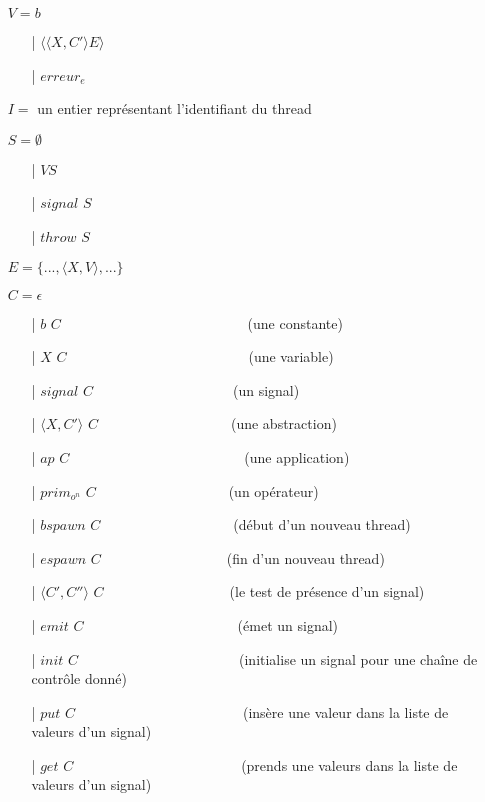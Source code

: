 \documentclass[10pt,a4paper]{article}
\begin{document}
			\begin{itemize}
				\item[] $V = b$	
				\begin{itemize}
					\item[|] $\langle\langle X,C' \rangle E\rangle$
					\item[|] $erreur_{e}$
				\end{itemize}
				\item[] $I =$ un entier représentant l'identifiant du thread
				\item[] $S =  \emptyset$ 
				\begin{itemize}
					\item[|] $V S$
					\item[|] $signal$ $S$
					\item[|] $throw$ $S$
				\end{itemize}
				\item[] $E = \{...,\langle X,V\rangle,...\}$
				\item[] $C = \epsilon$
				\begin{itemize}
					\item[|] $b$ $C$~~~~~~~~~~~~~~~~~~~~~~~~~~    (une constante)
					\item[|] $X$ $C$~~~~~~~~~~~~~~~~~~~~~~~~~~(une variable)
					\item[|] $signal$ $C$~~~~~~~~~~~~~~~~~~~~(un signal)
					\item[|] $\langle X,C'\rangle$ $C$~~~~~~~~~~~~~~~~~~~(une abstraction)
					\item[|] $ap$ $C$~~~~~~~~~~~~~~~~~~~~~~~~~(une application)
					\item[|] $prim_{o^{n}}$ $C$~~~~~~~~~~~~~~~~~~~(un opérateur)
					\item[|] $bspawn$ $C$~~~~~~~~~~~~~~~~~~~(début d'un nouveau thread)
					\item[|] $espawn$ $C$~~~~~~~~~~~~~~~~~~(fin d'un nouveau thread)
					\item[|] $\langle C',C''\rangle$ $C$~~~~~~~~~~~~~~~~~~(le test de présence d'un signal)
					\item[|] $emit$ $C$~~~~~~~~~~~~~~~~~~~~~~(émet un signal)
					\item[|] $init$ $C$~~~~~~~~~~~~~~~~~~~~~~~(initialise un signal pour une chaîne de contrôle donné)
					\item[|] $put$ $C$~~~~~~~~~~~~~~~~~~~~~~~~(insère une valeur dans la liste de valeurs d'un signal)
					\item[|] $get$ $C$~~~~~~~~~~~~~~~~~~~~~~~~(prends une valeurs dans la liste de valeurs d'un signal)

\end{itemize}
\end{itemize}
\end{document}
